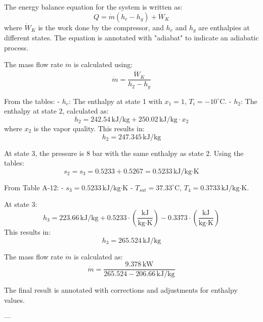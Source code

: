 The energy balance equation for the system is written as:  
\[
Q = \dot{m} \left( h_e - h_g \right) + \dot{W}_K
\]  
where \( \dot{W}_K \) is the work done by the compressor, and \( h_e \) and \( h_g \) are enthalpies at different states. The equation is annotated with "adiabat" to indicate an adiabatic process.

The mass flow rate \( \dot{m} \) is calculated using:  
\[
\dot{m} = \frac{\dot{W}_K}{h_2 - h_g}
\]  

From the tables:  
- \( h_e \): The enthalpy at state 1 with \( x_1 = 1 \), \( T_i = -10^\circ\text{C} \).  
- \( h_2 \): The enthalpy at state 2, calculated as:  
\[
h_2 = 242.54 \, \text{kJ/kg} + 250.02 \, \text{kJ/kg} \cdot x_2
\]  
where \( x_2 \) is the vapor quality. This results in:  
\[
h_2 = 247.345 \, \text{kJ/kg}
\]  

At state 3, the pressure is 8 bar with the same enthalpy as state 2. Using the tables:  
\[
s_2 = s_3 = 0.5233 + 0.5267 = 0.5233 \, \text{kJ/kg·K}
\]  

From Table A-12:  
- \( s_3 = 0.5233 \, \text{kJ/kg·K} \)  
- \( T_{sat} = 37.33^\circ\text{C} \), \( T_4 = 0.3733 \, \text{kJ/kg·K} \).  

At state 3:  
\[
h_3 = 223.66 \, \text{kJ/kg} + 0.5233 \cdot \left( \frac{\text{kJ}}{\text{kg·K}} \right) - 0.3373 \cdot \left( \frac{\text{kJ}}{\text{kg·K}} \right)
\]  
This results in:  
\[
h_3 = 265.524 \, \text{kJ/kg}
\]  

The mass flow rate \( \dot{m} \) is calculated as:  
\[
\dot{m} = \frac{9.378 \, \text{kW}}{265.524 - 206.66 \, \text{kJ/kg}}
\]  

The final result is annotated with corrections and adjustments for enthalpy values.

---
